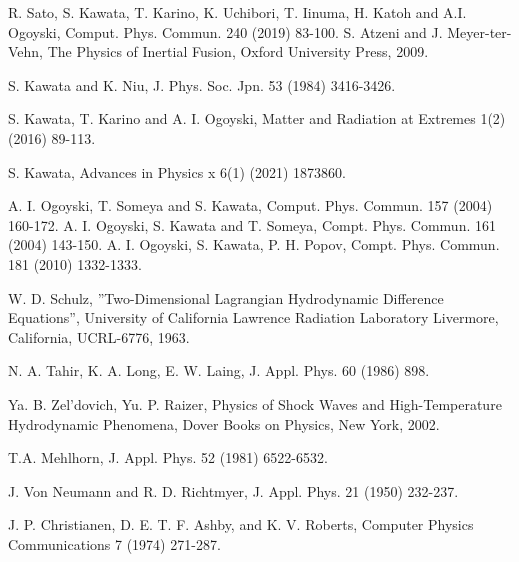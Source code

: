 




 \begin{thebibliography}{99}

R. Sato, S. Kawata, T. Karino, K. Uchibori, T. Iinuma, H. Katoh and A.I. Ogoyski, Comput. Phys. Commun. 240 (2019) 83-100. 
S. Atzeni and J. Meyer-ter-Vehn, The Physics of Inertial Fusion, Oxford University Press, 2009. 

 S. Kawata and K. Niu, J. Phys. Soc. Jpn. 53 (1984) 3416-3426. 
 
 
S. Kawata, T. Karino and A. I. Ogoyski, Matter and Radiation at Extremes 1(2) (2016)  89-113. 

S. Kawata, Advances in Physics x 6(1) (2021)  1873860. 


 
A. I. Ogoyski, T. Someya and S. Kawata, Comput. Phys. Commun. 157 (2004) 160-172.
A. I. Ogoyski, S. Kawata and T. Someya, Compt. Phys. Commun. 161 (2004) 143-150.
A. I. Ogoyski, S. Kawata, P. H. Popov, Compt. Phys. Commun. 181 (2010) 1332-1333. 

W. D. Schulz, ”Two-Dimensional Lagrangian Hydrodynamic Difference Equations”, University of California Lawrence Radiation Laboratory Livermore, California, UCRL-6776, 1963. 

N. A. Tahir, K. A. Long, E. W. Laing, J. Appl. Phys. 60 (1986) 898. 

Ya. B. Zel'dovich, Yu. P. Raizer, Physics of Shock Waves and High-Temperature Hydrodynamic Phenomena, Dover Books on Physics, New York, 2002. 

T.A. Mehlhorn, J. Appl. Phys. 52 (1981) 6522-6532. 

 J. Von Neumann and R. D. Richtmyer, J. Appl. Phys. 21 (1950) 232-237. 
 
J. P. Christianen, D. E. T. F. Ashby, and K. V. Roberts, Computer Physics Communications 7 (1974) 271-287. 
 

\end{thebibliography}

